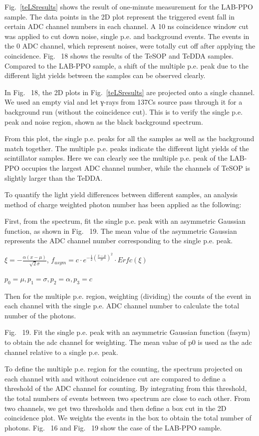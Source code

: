 Fig.~\ref{teLSresults} shows the result of one-minute measurement for the LAB-PPO sample. The data points in the 2D plot represent the triggered event fall in certain ADC channel numbers in each channel. A 10 ns coincidence window cut was applied to cut down noise, single p.e. and background events. The events in the 0 ADC channel, which represent noises, were totally cut off after applying the coincidence. Fig.~ 18 shows the results of the TeSOP and TeDDA samples.  Compared to the LAB-PPO sample, a shift of the multiple p.e. peak due to the different light yields between the samples can be observed clearly.

In Fig.~ 18, the 2D plots in Fig.~\ref{teLSresults} are projected onto a single channel. We used an empty vial and let γ-rays from 137Cs source pass through it for a background run (without the coincidence cut). This is to verify the single p.e. peak and noise region, shown as the black background spectrum.

From this plot, the single p.e. peaks for all the samples as well as the background match together. The multiple p.e. peaks indicate the different light yields of the scintillator samples. Here we can clearly see the multiple p.e. peak of the LAB-PPO occupies the largest ADC channel number, while the channels of TeSOP is slightly larger than the TeDDA. 

To quantify the light yield differences between different samples, an analysis method of charge weighted photon number has been applied as the following:

First, from the spectrum, fit the single p.e. peak with an asymmetric Gaussian function, as shown in Fig.~ 19. The mean value of the asymmetric Gaussian represents the ADC channel number corresponding to the single p.e. peak.

$\xi=-\frac{\alpha(x-\mu)}{\sqrt 2\sigma}$,
$f_{asym}=c\cdot e^{-\frac{1}{2}(\frac{x-\mu}{\sigma})^2}\cdot Erfc(\xi)$

$p_0=\mu,p_1=\sigma,p_2=\alpha, p_3=c$ 

Then for the multiple p.e. region, weighting (dividing) the counts of the event in each channel with the single p.e. ADC channel number to calculate the total number of the photons.


Fig.~ 19. Fit the single p.e. peak with an asymmetric Gaussian function (fasym) to obtain the adc channel for weighting. The mean value of p0 is used as the adc channel relative to a single p.e. peak.

To define the multiple p.e. region for the counting, the spectrum projected on each channel with and without coincidence cut are compared to define a threshold of the ADC channel for counting. By integrating from this threshold, the total numbers of events between two spectrum are close to each other. From two channels, we get two thresholds and then define a box cut in the 2D coincidence plot. We weights the events in the box to obtain the total number of photons. Fig.~ 16 and Fig.~ 19 show the case of the LAB-PPO sample.

